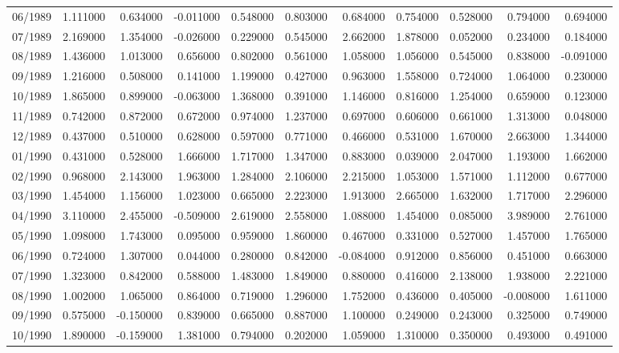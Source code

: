 \begin{tabular}{lrrrrrrrrrr}
06/1989 & 1.111000 & 0.634000 & -0.011000 & 0.548000 & 0.803000 & 0.684000 & 0.754000 & 0.528000 & 0.794000 & 0.694000 \\
07/1989 & 2.169000 & 1.354000 & -0.026000 & 0.229000 & 0.545000 & 2.662000 & 1.878000 & 0.052000 & 0.234000 & 0.184000 \\
08/1989 & 1.436000 & 1.013000 & 0.656000 & 0.802000 & 0.561000 & 1.058000 & 1.056000 & 0.545000 & 0.838000 & -0.091000 \\
09/1989 & 1.216000 & 0.508000 & 0.141000 & 1.199000 & 0.427000 & 0.963000 & 1.558000 & 0.724000 & 1.064000 & 0.230000 \\
10/1989 & 1.865000 & 0.899000 & -0.063000 & 1.368000 & 0.391000 & 1.146000 & 0.816000 & 1.254000 & 0.659000 & 0.123000 \\
11/1989 & 0.742000 & 0.872000 & 0.672000 & 0.974000 & 1.237000 & 0.697000 & 0.606000 & 0.661000 & 1.313000 & 0.048000 \\
12/1989 & 0.437000 & 0.510000 & 0.628000 & 0.597000 & 0.771000 & 0.466000 & 0.531000 & 1.670000 & 2.663000 & 1.344000 \\
01/1990 & 0.431000 & 0.528000 & 1.666000 & 1.717000 & 1.347000 & 0.883000 & 0.039000 & 2.047000 & 1.193000 & 1.662000 \\
02/1990 & 0.968000 & 2.143000 & 1.963000 & 1.284000 & 2.106000 & 2.215000 & 1.053000 & 1.571000 & 1.112000 & 0.677000 \\
03/1990 & 1.454000 & 1.156000 & 1.023000 & 0.665000 & 2.223000 & 1.913000 & 2.665000 & 1.632000 & 1.717000 & 2.296000 \\
04/1990 & 3.110000 & 2.455000 & -0.509000 & 2.619000 & 2.558000 & 1.088000 & 1.454000 & 0.085000 & 3.989000 & 2.761000 \\
05/1990 & 1.098000 & 1.743000 & 0.095000 & 0.959000 & 1.860000 & 0.467000 & 0.331000 & 0.527000 & 1.457000 & 1.765000 \\
06/1990 & 0.724000 & 1.307000 & 0.044000 & 0.280000 & 0.842000 & -0.084000 & 0.912000 & 0.856000 & 0.451000 & 0.663000 \\
07/1990 & 1.323000 & 0.842000 & 0.588000 & 1.483000 & 1.849000 & 0.880000 & 0.416000 & 2.138000 & 1.938000 & 2.221000 \\
08/1990 & 1.002000 & 1.065000 & 0.864000 & 0.719000 & 1.296000 & 1.752000 & 0.436000 & 0.405000 & -0.008000 & 1.611000 \\
09/1990 & 0.575000 & -0.150000 & 0.839000 & 0.665000 & 0.887000 & 1.100000 & 0.249000 & 0.243000 & 0.325000 & 0.749000 \\
10/1990 & 1.890000 & -0.159000 & 1.381000 & 0.794000 & 0.202000 & 1.059000 & 1.310000 & 0.350000 & 0.493000 & 0.491000 \\

\end{tabular}

